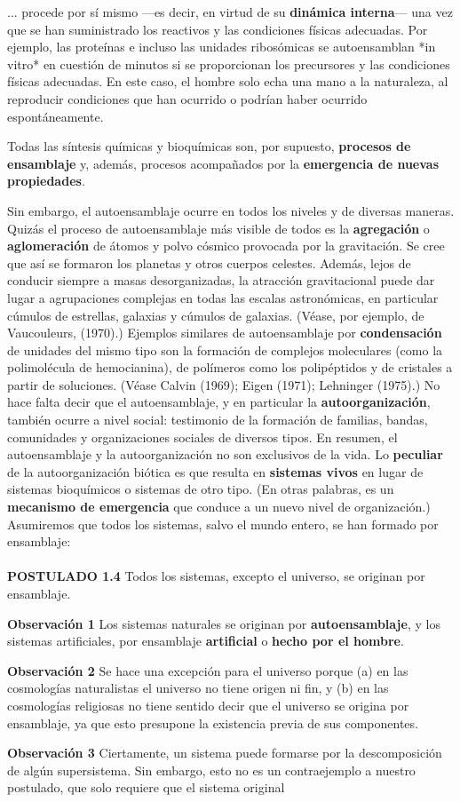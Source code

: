{\fontsize{13}{15}\selectfont
... procede por sí mismo —es decir, en virtud de su \textbf{dinámica interna}— una vez que se han suministrado los reactivos y las condiciones físicas adecuadas. Por ejemplo, las proteínas e incluso las unidades ribosómicas se autoensamblan *in vitro* en cuestión de minutos si se proporcionan los precursores y las condiciones físicas adecuadas. En este caso, el hombre solo echa una mano a la naturaleza, al reproducir condiciones que han ocurrido o podrían haber ocurrido espontáneamente.

Todas las síntesis químicas y bioquímicas son, por supuesto, \textbf{procesos de ensamblaje} y, además, procesos acompañados por la \textbf{emergencia de nuevas propiedades}.

Sin embargo, el autoensamblaje ocurre en todos los niveles y de diversas maneras. Quizás el proceso de autoensamblaje más visible de todos es la \textbf{agregación} o \textbf{aglomeración} de átomos y polvo cósmico provocada por la gravitación. Se cree que así se formaron los planetas y otros cuerpos celestes. Además, lejos de conducir siempre a masas desorganizadas, la atracción gravitacional puede dar lugar a agrupaciones complejas en todas las escalas astronómicas, en particular cúmulos de estrellas, galaxias y cúmulos de galaxias. (Véase, por ejemplo, de Vaucouleurs, (1970).) Ejemplos similares de autoensamblaje por \textbf{condensación} de unidades del mismo tipo son la formación de complejos moleculares (como la polimolécula de hemocianina), de polímeros como los polipéptidos y de cristales a partir de soluciones. (Véase Calvin (1969); Eigen (1971); Lehninger (1975).) No hace falta decir que el autoensamblaje, y en particular la \textbf{autoorganización}, también ocurre a nivel social: testimonio de la formación de familias, bandas, comunidades y organizaciones sociales de diversos tipos. En resumen, el autoensamblaje y la autoorganización no son exclusivos de la vida. Lo \textbf{peculiar} de la autoorganización biótica es que resulta en \textbf{sistemas vivos} en lugar de sistemas bioquímicos o sistemas de otro tipo. (En otras palabras, es un \textbf{mecanismo de emergencia} que conduce a un nuevo nivel de organización.) Asumiremos que todos los sistemas, salvo el mundo entero, se han formado por ensamblaje:
\\\\
\textbf{POSTULADO 1.4} Todos los sistemas, excepto el universo, se originan por ensamblaje.

\textbf{Observación 1} Los sistemas naturales se originan por \textbf{autoensamblaje}, y los sistemas artificiales, por ensamblaje \textbf{artificial} o \textbf{hecho por el hombre}.

\textbf{Observación 2} Se hace una excepción para el universo porque (a) en las cosmologías naturalistas el universo no tiene origen ni fin, y (b) en las cosmologías religiosas no tiene sentido decir que el universo se origina por ensamblaje, ya que esto presupone la existencia previa de sus componentes.

\textbf{Observación 3} Ciertamente, un sistema puede formarse por la descomposición de algún supersistema. Sin embargo, esto no es un contraejemplo a nuestro postulado, que solo requiere que el sistema original
}

